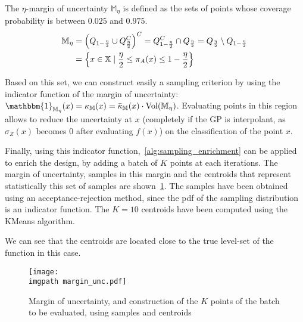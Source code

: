 \documentclass[../../Main_ManuscritThese.tex]{subfiles}
\newcommand\imgpath{/home/victor/acadwriting/Manuscrit/Text/Chapter4/img/}
\begin{document}
The $\eta$-margin of uncertainty $\mathbb{M}_{\eta}$ is defined as the sets of points whose coverage probability is between $0.025$ and $0.975$.
\begin{align}
  \label{eq:margin_unc}
  \mathbb{M}_{\eta} &= \left(Q_{1-\frac{\eta}{2}} \cup Q^C_{\frac{\eta}{2}} \right)^C = Q_{1-\frac{\eta}{2}}^C \cap Q_{\frac{\eta}{2}} = Q_{\frac{\eta}{2}} \setminus Q_{1-\frac{\eta}{2}} \\
                    &= \left\{x \in \mathbb{X} \mid \frac{\eta}{2} \leq \pi_A(x) \leq 1 - \frac{\eta}{2} \right\}
\end{align}

Based on this set, we can construct easily a sampling criterion by
using the indicator function of the margin of uncertainty:
$\mathbbm{1}_{\mathbb{M}_{\eta}}(x)=\kappa_{\mathbb{M}}(x) =
\bar{\kappa}_{\mathbb{M}}(x) \cdot \mathrm{Vol}(\mathbb{M}_{\eta})$.
 Evaluating points in this region allows to reduce
the uncertainty at $x$ (completely if the GP is interpolant, as
$\sigma_Z(x)$ becomes $0$ after evaluating $f(x)$) on the
classification of the point $x$.

Finally, using this indicator function,~\cref{alg:sampling_enrichment}
can be applied to enrich the design, by adding a batch of $K$ points
at each iterations.  The margin of uncertainty, samples
in this margin and the centroids that represent statistically this set
of samples are shown~\cref{fig:margin_unc}. The samples have been
obtained using an acceptance-rejection method, since the pdf of the
sampling distribution is an indicator function. The $K=\num{10}$
centroids have been computed using the KMeans algorithm.

We can see that the centroids are located close to the true level-set of the function in this case.
\begin{figure}[ht]
  \centering
  \texttt{[image: \\imgpath margin\_unc.pdf]}
  \caption{\label{fig:margin_unc} Margin of uncertainty, and
    construction of the $K$ points of the batch to be evaluated, using
    samples and centroids}
\end{figure}

\end{document}
